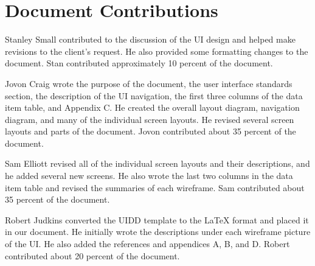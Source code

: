 \documentclass{article}
\begin{document}
\newpage
\section{Document Contributions}

Stanley Small contributed to the discussion of the UI design and helped make revisions to the client's request. He also provided some formatting changes to the document. Stan contributed approximately 10 percent of the document.

Jovon Craig wrote the purpose of the document, the user interface standards section, the description of the UI navigation, the first three columns of the data item table, and Appendix C. He created the overall layout diagram, navigation diagram, and many of the individual screen layouts. He revised several screen layouts and parts of the document. Jovon contributed about 35 percent of the document.

Sam Elliott revised all of the individual screen layouts and their descriptions, and he added several new screens. He also wrote the last two columns in the data item table and revised the summaries of each wireframe. Sam contributed about 35 percent of the document.

Robert Judkins converted the UIDD template to the LaTeX format and placed it in our document. He initially wrote the descriptions under each wireframe picture of the UI. He also added the references and appendices A, B, and D. Robert contributed about 20 percent of the document.

\newpage




\newpage



\end{document}
